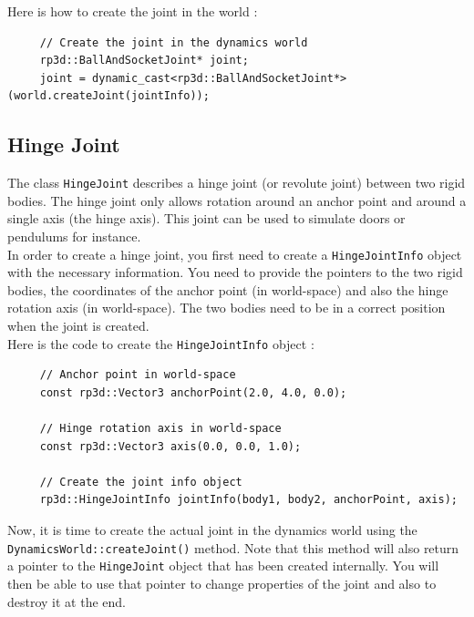 \documentclass[a4paper,12pt]{article}
\begin{document}
    Here is how to create the joint in the world : \\

    \begin{lstlisting}
     // Create the joint in the dynamics world
     rp3d::BallAndSocketJoint* joint;
     joint = dynamic_cast<rp3d::BallAndSocketJoint*>(world.createJoint(jointInfo));
  \end{lstlisting}

    \vspace{0.6cm}

    \subsection{Hinge Joint}

    The class \texttt{HingeJoint} describes a hinge joint (or revolute joint) between two rigid bodies. The hinge joint only allows rotation around an anchor point and
    around a single axis (the hinge axis). This joint can be used to simulate doors or pendulums for instance. \\

    In order to create a hinge joint, you first need to create a \texttt{HingeJointInfo} object with the necessary information. You need to provide the pointers to the
    two rigid bodies, the coordinates of the anchor point (in world-space) and also the hinge rotation axis (in world-space). The two bodies need to be in a correct position
    when the joint is created. \\

    Here is the code to create the \texttt{HingeJointInfo} object : \\

    \begin{lstlisting}
     // Anchor point in world-space
     const rp3d::Vector3 anchorPoint(2.0, 4.0, 0.0);

     // Hinge rotation axis in world-space
     const rp3d::Vector3 axis(0.0, 0.0, 1.0);

     // Create the joint info object
     rp3d::HingeJointInfo jointInfo(body1, body2, anchorPoint, axis);
  \end{lstlisting}

    \vspace{0.6cm}

    Now, it is time to create the actual joint in the dynamics world using the \texttt{DynamicsWorld::createJoint()} method.
    Note that this method will also return a pointer to the \texttt{HingeJoint} object that has been created internally. You will then
    be able to use that pointer to change properties of the joint and also to destroy it at the end. \\
\end{document}
